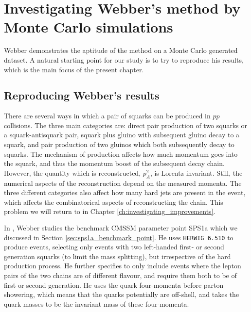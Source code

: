 \documentclass[twoside,english]{uiofysmaster}
\begin{document}
\chapter{Investigating Webber's method by Monte Carlo simulations}
\label{ch:MC}
Webber demonstrates the aptitude of the method on a Monte Carlo generated dataset. A natural starting point for our study is to try to reproduce his results, which is the main focus of the present chapter. 

\section{Reproducing Webber's results}
There are several ways in which a pair of squarks can be produced in $pp$ collisions. The three main categories are: direct pair production of two squarks or a squark-antisquark pair, squark plus gluino with subsequent gluino decay to a squark, and pair production of two gluinos which both subsequently decay to squarks. The mechanism of production affects how much momentum goes into the squark, and thus the momentum boost of the subsequent decay chain. However, the quantity which is reconstructed, $p_A^2$, is Lorentz invariant. Still, the numerical aspects of the reconstruction depend on the measured momenta. The three different categories also affect how many hard jets are present in the event, which affects the combinatorical aspects of reconstructing the chain. This problem we will return to in Chapter \ref{ch:investigating_improvements}.

In \cite{Webber:2009vm}, Webber studies the benchmark CMSSM parameter point SPS1a \cite{Allanach:2002nj} which we discussed in Section \ref{sec:sps1a_benchmark_point}. He uses {\tt HERWIG 6.510} \cite{Corcella:2000bw,Moretti:2002eu} to produce events, selecting only events with two left-handed first- or second generation squarks (to limit the mass splitting), but irrespective of the hard production process. He further specifies to only include events where the lepton pairs of the two chains are of different flavour, and require them both to be of first or second generation. He uses the quark four-momenta before parton showering, which means that the quarks potentially are off-shell, and takes the quark masses to be the invariant mass of these four-momenta.
\end{document}
